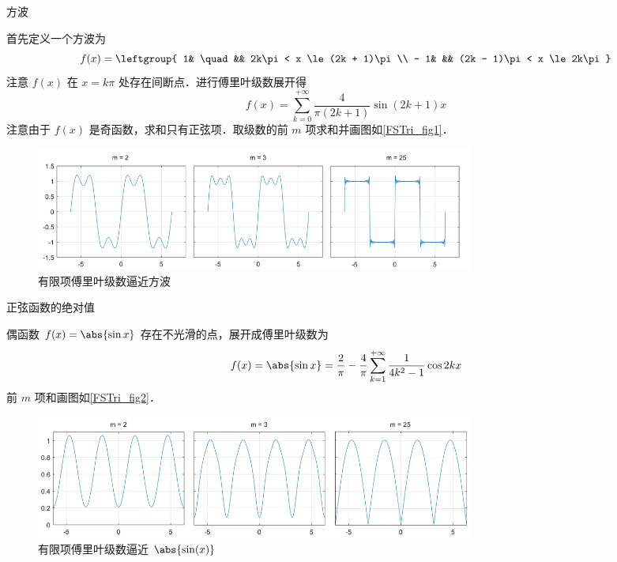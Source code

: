 
\begin{exam}{方波}

首先定义一个方波为
\begin{equation}
f(x) = \leftgroup{
1& \quad && 2k\pi < x \le (2k + 1)\pi \\
- 1& &&   (2k - 1)\pi < x \le 2k\pi 
}\end{equation}
注意 $f(x)$ 在 $x=k\pi$ 处存在间断点．进行傅里叶级数展开得
\begin{equation}
f(x) = \sum_{k = 0}^{+\infty} \frac{4}{{\pi (2k + 1)}}\sin (2k + 1)x
\end{equation}
注意由于 $f(x)$ 是奇函数，求和只有正弦项．取级数的前 $m$ 项求和并画图如\autoref{FSTri_fig1}．

\begin{figure}[ht]
\centering
\includegraphics[width=14.5cm]{./figures/FSTri1.pdf}
\caption{有限项傅里叶级数逼近方波}\label{FSTri_fig1}
\end{figure}
\end{exam}

\begin{exam}{正弦函数的绝对值} %

偶函数 $f(x) = \abs{\sin x}$ 存在不光滑的点，展开成傅里叶级数为
\begin{equation}
f(x) = \abs{\sin x} = \frac{2}{\pi } - \frac{4}{\pi }\sum_{k = 1}^{+\infty} \frac{1}{{4 k^2 - 1}}\cos 2k x
\end{equation}
前 $m$ 项和画图如\autoref{FSTri_fig2}．
\begin{figure}[ht]
\centering
\includegraphics[width=14.5cm]{./figures/FSTri2.pdf}
\caption{有限项傅里叶级数逼近 $\abs{\sin(x)}$}\label{FSTri_fig2}
\end{figure}
\end{exam}


